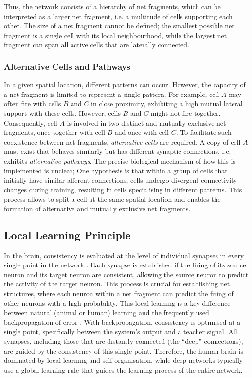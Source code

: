 Thus, the network consists of a hierarchy of net fragments, which can be interpreted as a larger net fragment, i.e. a multitude of cells supporting each other.
The size of a net fragment cannot be defined; the smallest possible net fragment is a single cell with its local neighbourhood, while the largest net fragment can span all active cells that are laterally connected.

\subsubsection{Alternative Cells and Pathways}
In a given spatial location, different patterns can occur.
However, the capacity of a net fragment is limited to represent a single pattern.
For example, cell $A$ may often fire with cells $B$ and $C$ in close proximity, exhibiting a high mutual lateral support with these cells.
However, cells $B$ and $C$ might not fire together. Consequently, cell $A$ is involved in two distinct and mutually exclusive net fragments, once together with cell $B$ and once with cell $C$.
To facilitate such coexistence between net fragments, \emph{alternative cells} are required. A copy of cell $A$ must exist that behaves similarly but has different synaptic connections, i.e. exhibits \emph{alternative pathways}.
The precise biological mechanism of how this is implemented is unclear; One hypothesis is that within a group of cells that initially have similar afferent connections, cells undergo divergent connectivity changes during training, resulting in cells specialising in different patterns. This process allows to split a cell at the same spatial location and enables the formation of alternative and mutually exclusive net fragments.

\subsection{Local Learning Principle}
In the brain, consistency is evaluated at the level of individual synapses in every single point in the network . Each synapse is established if the firing of its source neuron and its target neuron are consistent, allowing the source neuron to predict the activity of the target neuron. This process is crucial for establishing net structures, where each neuron within a net fragment can predict the firing of other neurons with a high probability.
This local learning is a key difference between natural (animal or human) learning and the frequently used backpropagation of error . With backpropagation, consistency is optimised at a single point, specifically between the system's output and a teacher signal. All synapses, including those that are distantly connected (the ``deep'' connections), are guided by the consistency of this single point. Therefore, the human brain is dominated by local learning and self-organisation, while deep networks typically use a global learning rule that guides the learning process of the entire network.



